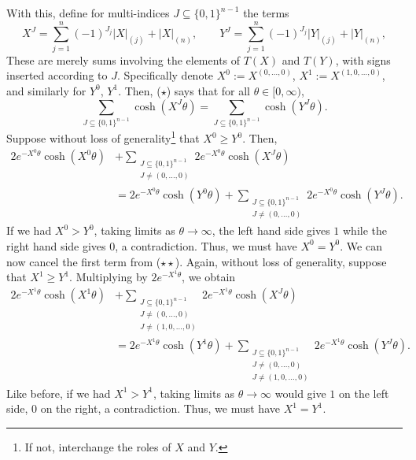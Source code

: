 \documentclass[11pt]{article}
\begin{document}
\begin{enumerate}
        With this, define for multi-indices $J \subseteq \{0, 1\}^{n - 1}$ the terms \[
            X^J = \sum_{j = 1}^n (-1)^{J_j} |X|_{(j)} + |X|_{(n)}, \qquad
            Y^J = \sum_{j = 1}^n (-1)^{J_j} |Y|_{(j)} + |Y|_{(n)},
        \] These are merely sums involving the elements of $T(X)$ and $T(Y)$,
        with signs inserted according to $J$.
        Specifically denote $X^0 := X^{(0, \dots, 0)}$, $X^1 := X^{(1, 0,
        \dots, 0)}$, and similarly for $Y^0$, $Y^1$.
        Then, ($\star$) says that for all $\theta \in [0, \infty)$, \[
            \sum_{J \subseteq \{0, 1\}^{n - 1}} \cosh(X^J\theta)
                = \sum_{J \subseteq \{0, 1\}^{n - 1}} \cosh(Y^J\theta).
                    \tag{$\star\star$}
        \] Suppose without loss of generality\footnote{If not, interchange the
        roles of $X$ and $Y$.} that $X^0 \geq Y^0$.
        Then, \begin{align*}
            2e^{-X^0\theta} \cosh(X^0\theta) &+ \sum_{\substack{J \subseteq \{0, 1\}^{n - 1} \\ J \neq (0, \dots, 0)}} 2e^{-X^0\theta}\cosh(X^J\theta) \\
                &= 2e^{-X^0\theta} \cosh(Y^0\theta) + \sum_{\substack{J \subseteq \{0, 1\}^{n - 1} \\ J \neq (0, \dots, 0)}} 2e^{-X^0\theta}\cosh(Y^J\theta).
        \end{align*}
        If we had $X^0 > Y^0$, taking limits as $\theta \to \infty$, the left
        hand side gives $1$ while the right hand side gives $0$, a contradiction.
        Thus, we must have $X^0 = Y^0$.
        We can now cancel the first term from ($\star\star$).
        Again, without loss of generality, suppose that $X^1 \geq Y^1$.
        Multiplying by $2e^{-X^1\theta}$, we obtain \begin{align*}
            2e^{-X^1\theta} \cosh(X^1\theta) &+ \sum_{\substack{J \subseteq \{0, 1\}^{n - 1} \\ J \neq (0, \dots, 0) \\ J \neq (1, 0, \dots, 0)}} 2e^{-X^1\theta}\cosh(X^J\theta) \\
                &= 2e^{-X^1\theta} \cosh(Y^1\theta) + \sum_{\substack{J \subseteq \{0, 1\}^{n - 1} \\ J \neq (0, \dots, 0) \\ J \neq (1, 0, \dots, 0)}} 2e^{-X^1\theta}\cosh(Y^J\theta).
        \end{align*}
        Like before, if we had $X^1 > Y^1$, taking limits as $\theta \to
        \infty$ would give $1$ on the left side, $0$ on the right, a contradiction.
        Thus, we must have $X^1 = Y^1$.


\end{enumerate}
\end{document}
